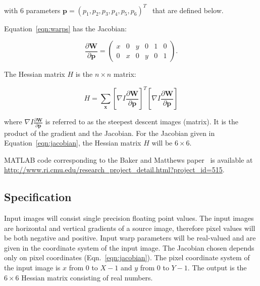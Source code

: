 \documentclass{report}
\begin{document}
\noindent with 6 parameters $\textbf{p} = (p_{1}, p_{2}, p_{3}, p_{4},
p_{5}, p_{6})^{T}$~\cite{Bergen92} that are defined below.

\noindent Equation~\ref{eqn:warps} has the Jacobian:

\begin{equation}
 \frac{\partial \textbf{W}}{\partial \textbf{p}} = \begin{pmatrix}
                                                    x & 0 & y & 0 & 1 & 0 \\
                                                    0 & x & 0 & y & 0 & 1
                                                   \end{pmatrix}.
\label{eqn:jacobian}
\end{equation}

\noindent The Hessian matrix $H$ is the $n \times n$ matrix:

\begin{equation}
 H = \sum_{\textbf{x}} \left[ \nabla I  \frac{\partial \textbf{W}}{\partial \textbf{p}} \right]^{T}
                       \left[ \nabla I  \frac{\partial \textbf{W}}{\partial \textbf{p}} \right]
\label{eqn:hessian}
\end{equation}

\noindent where $\nabla I  \frac{\partial \textbf{W}}{\partial \textbf{p}}$ is referred to as the
steepest descent images (matrix).  It is the product of the gradient and the Jacobian.  For the
Jacobian given in Equation~\ref{eqn:jacobian}, the Hessian matrix $H$ will be $6 \times 6$.

MATLAB code corresponding to the Baker and Matthews paper~\cite{BakerMatthews04} is available at
\url{http://www.ri.cmu.edu/research_project_detail.html?project_id=515}.

\subsection{Specification}
\label{sec:wami:image_registration:spec}

Input images will consist single precision floating point values.  The input images are horizontal
and vertical gradients of a source image, therefore pixel values will be both negative and positive.
Input warp parameters will be real-valued and are given in the coordinate system of the input image.
The Jacobian chosen depends only on pixel coordinates (Eqn.~\ref{eqn:jacobian}).  The pixel coordinate system of the input image
is $x$ from $0$ to $X-1$ and $y$ from $0$ to $Y-1$.
The output is the $6 \times 6$ Hessian matrix consisting of real numbers.
\end{document}
